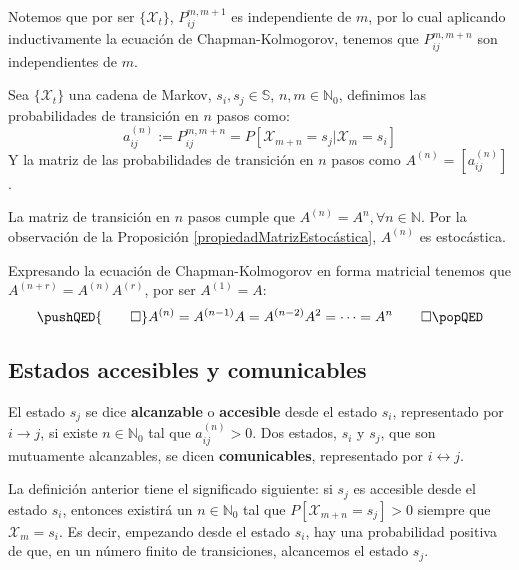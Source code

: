 Notemos que por ser $\{\mathcal{X}_t\}$, $P_{ij}^{m,m+1}$ es independiente de $m$, por lo cual aplicando inductivamente la ecuación de Chapman-Kolmogorov, tenemos que $P_{ij}^{m,m+n}$ son independientes de $m$. 
\begin{definition}
Sea $\{\mathcal{X}_t\}$ una cadena de Markov, $s_i, s_j \in \mathbb{S}$, $n,m\in\mathbb{N}_0$,  definimos las probabilidades de transición en $n$ pasos como:
\[a_{ij}^{(n)}:=P_{ij}^{m,m+n}=P[\mathcal{X}_{m+n}=s_j|\mathcal{X}_m=s_i]\]
Y la matriz de las probabilidades de transición en $n$ pasos como $A^{(n)}=[a_{ij}^{(n)}]$.
\end{definition}
\begin{lemma}
La matriz de transición en $n$ pasos cumple que $A^{(n)}=A^n, \forall n\in\mathbb{N}$. Por la observación de la Proposición \ref{propiedadMatrizEstocástica}, $A^{(n)}$ es estocástica.
\end{lemma}
\begin{proofs*}
 Expresando la ecuación de Chapman-Kolmogorov en forma matricial tenemos que $A^{(n+r)}=A^{(n)}A^{(r)}$, por ser $A^{(1)}=A$:
    \[
    \pushQED{\qed}
    A^{(n)}=A^{(n-1)}A=A^{(n-2)}A^2=\dots=A^n \qedhere
    \popQED\]    
\end{proofs*}

\subsection{Estados accesibles y comunicables}
\begin{definition}
    El estado $s_j$ se dice \textbf{alcanzable} o \textbf{accesible} desde el estado $s_i$, representado por $i\longrightarrow j$, si existe $n\in\mathbb{N}_0$ tal que $a_{ij}^{(n)}>0$. Dos estados, $s_i$ y $s_j$, que son mutuamente alcanzables, se dicen \textbf{comunicables}, representado por $i\longleftrightarrow j$.
\end{definition}

La definición anterior tiene el significado siguiente: si $s_j$ es accesible desde el estado $s_i$, entonces existirá un $n\in\mathbb{N}_0$ tal que $P[\mathcal{X}_{m+n}=s_j]>0$ siempre que $\mathcal{X}_m=s_i$.  Es decir, empezando desde el estado $s_i$, hay una probabilidad positiva de que, en un número finito de transiciones, alcancemos el estado $s_j$.

